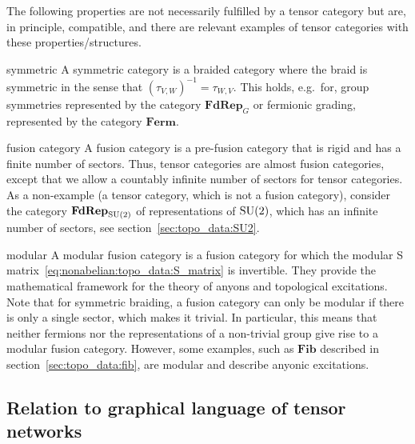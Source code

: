 The following properties are not necessarily fulfilled by a tensor category but are, in principle, compatible, and there are relevant examples of tensor categories with these properties/structures.

\begin{jargon}
    \item[symmetric]
    A symmetric category is a braided category where the braid is symmetric in the sense that $(\tau_{V,W})^{-1} = \tau_{W,V}$. This holds, e.g.~for, group symmetries represented by the category $\mathbf{FdRep}_G$ or fermionic grading, represented by the category $\mathbf{Ferm}$.
    
    \item[fusion category]
    A fusion category is a pre-fusion category that is rigid and has a finite number of sectors.
    Thus, tensor categories are almost fusion categories, except that we allow a countably infinite number of sectors for tensor categories.
    As a non-example (a tensor category, which is not a fusion category), consider the category $\mathbf{FdRep}_{\mathrm{SU}(2)}$ of representations of $\mathrm{SU}(2)$, which has an infinite number of sectors, see section~\ref{sec:topo_data:SU2}.
    
    \item[modular]
    A modular fusion category is a fusion category for which the modular S matrix~\eqref{eq:nonabelian:topo_data:S_matrix} is invertible.
    They provide the mathematical framework for the theory of anyons and topological excitations.
    Note that for symmetric braiding, a fusion category can only be modular if there is only a single sector, which makes it trivial.
    In particular, this means that neither fermions nor the representations of a non-trivial group give rise to a modular fusion category.
    However, some examples, such as $\mathbf{Fib}$ described in section~\ref{sec:topo_data:fib}, are modular and describe anyonic excitations.
\end{jargon}



\subsection{Relation to graphical language of tensor networks}
\label{subsec:nonablian:basics:graphical_notation_tensor networks}

